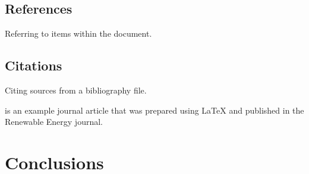 \documentclass[10pt]{article}
\begin{document}
\subsection{References}
Referring to items within the document.


\subsection{Citations}
Citing sources from a bibliography file.

\cite{Larson2016} is an example journal article that was prepared using LaTeX
and published in the Renewable Energy journal.



\section{Conclusions}





%



\end{document}
